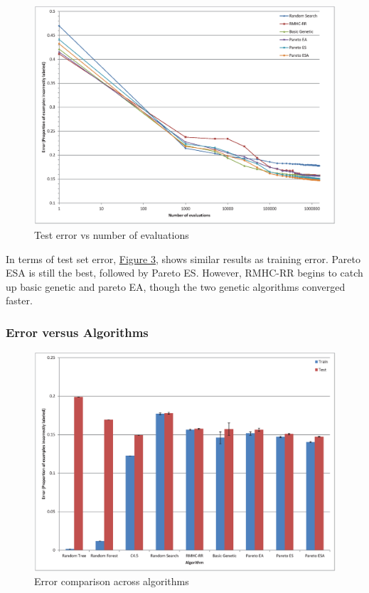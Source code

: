 \documentclass{acm_proc_article-sp}
\begin{document}
\begin{figure}[h]
\centering
\includegraphics[width=\linewidth]{test_chart.eps}
\caption{Test error vs number of evaluations}\label{test}
\end{figure}

In terms of test set error, \hyperref[test]{Figure 3}, shows similar results as training error. Pareto ESA is still the best, followed by Pareto ES. However, RMHC-RR begins to catch up basic genetic and pareto EA, though the two genetic algorithms converged faster.

\subsubsection{Error versus Algorithms}

\begin{figure}[h]
\centering
\includegraphics[width=\linewidth]{error_comparison_chart.eps}
\caption{Error comparison across algorithms}\label{algorithms}
\end{figure}
\end{document}
